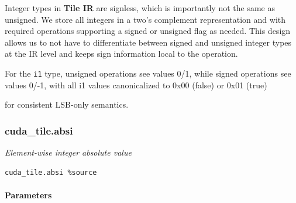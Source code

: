 \documentclass{article}
\begin{document}
Integer types in \textbf{Tile IR} are signless, which is importantly not the same as unsigned. We store all integers in a two's complement representation and with required operations supporting a signed or unsigned flag as needed. This design allows us to not have to differentiate between signed and unsigned integer types at the IR level and keeps sign information local to the operation.


For the \texttt{i1} type, unsigned operations see values 0/1, while signed operations see values 0/-1,  with all i1 values canonicalized to 0x00 (false) or 0x01 (true)

for consistent LSB-only semantics.



\subsubsection{cuda\_tile.absi}

\textit{Element-wise integer absolute value}


\begin{lstlisting}
cuda_tile.absi %source
\end{lstlisting}

\paragraph{Parameters}
\end{document}
